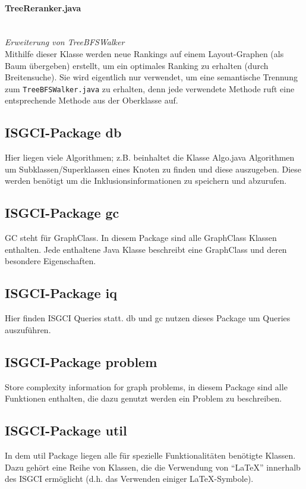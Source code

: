 \documentclass[10pt,a4paper]{article}
\begin{document}
\paragraph{TreeReranker.java}\ \\
\emph{Erweiterung von TreeBFSWalker}\\
{\footnotesize Mithilfe dieser Klasse werden neue Rankings auf einem Layout-Graphen (als Baum übergeben) erstellt, um ein optimales Ranking zu erhalten (durch Breitensuche). Sie wird eigentlich nur verwendet, um eine semantische Trennung zum \texttt{TreeBFSWalker.java} zu erhalten, denn jede verwendete Methode ruft eine entsprechende Methode aus der Oberklasse auf.}


\subsection{ISGCI-Package db}
Hier liegen viele Algorithmen; z.B. beinhaltet die Klasse Algo.java Algorithmen um Subklassen/Superklassen eines Knoten zu finden und diese auszugeben. Diese werden benötigt um die Inklusionsinformationen zu speichern und abzurufen.\\

\subsection{ISGCI-Package gc}
GC steht für GraphClass. In diesem Package sind alle GraphClass Klassen enthalten. Jede enthaltene Java Klasse beschreibt eine GraphClass und deren besondere Eigenschaften.\\

\subsection{ISGCI-Package iq}
Hier finden ISGCI Queries statt. db und gc nutzen dieses Package um Queries auszuführen. \\

\subsection{ISGCI-Package problem}
Store complexity information for graph problems, in diesem Package sind alle Funktionen enthalten, die dazu genutzt werden ein Problem zu beschreiben.\\

\subsection{ISGCI-Package util}
In dem util Package liegen alle für spezielle Funktionalitäten benötigte Klassen. Dazu gehört eine Reihe von Klassen, die die Verwendung von "`LaTeX"' innerhalb des ISGCI ermöglicht (d.h. das Verwenden einiger LaTeX-Symbole).\\
\end{document}
